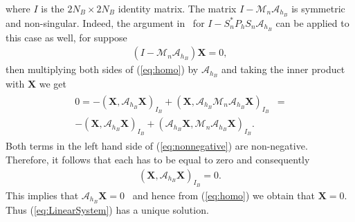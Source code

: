 \documentclass[preprint,12pt]{elsarticle}
\begin{document}
where $\mathit{I}$ is the $2N_B\times 2N_B$ identity matrix.
The matrix $\mathit{I}- \mathcal{M}_n\mathcal{A}_{h_B}$ is symmetric and non-singular. Indeed, the argument in~\cite{TP92} for $\mathit{I}- S^*_n P_h S_n \mathcal{A}_{h_B}$ can be applied to this case as well, for suppose
\begin{align}
(\mathit{I}- \mathcal{M}_n\mathcal{A}_{h_B}) \mathbf{X} =0, \label{eq:homo}
\end{align}
then multiplying both sides of (\ref{eq:homo}) by $\mathcal{A}_{h_B}$ and taking the inner product
with $\mathbf{X}$ we get
\begin{align}
\begin{split}
0=-(\mathbf{X}, \mathcal{A}_{h_B}\mathbf{X})_{I_B} + (\mathbf{X},\mathcal{A}_{h_B}\mathcal{M}_ n\mathcal{A}_{h_B} \mathbf{X})_{I_B} &= \\
-(\mathbf{X}, \mathcal{A}_{h_B}\mathbf{X})_{I_B} + (\mathcal{A}_{h_B}\mathbf{X},\mathcal{M}_n \mathcal{A}_{h_B} \mathbf{X})_{I_B} .
\end{split}
  \label{eq:nonnegative}
\end{align}
 Both terms in the left hand side of (\ref{eq:nonnegative}) are non-negative. Therefore, it follows that each has to be equal to zero and consequently
\begin{align}
(\mathbf{X},\mathcal{A}_{h_B}\mathbf{X})_{I_B} =0. 
\end{align}
This implies that $\mathcal{A}_{h_B}\mathbf{X}=0$~\cite{TP92} and hence from (\ref{eq:homo}) we obtain that 
$\mathbf{X}=0$. Thus (\ref{eq:LinearSystem}) has a unique solution.
\end{document}
